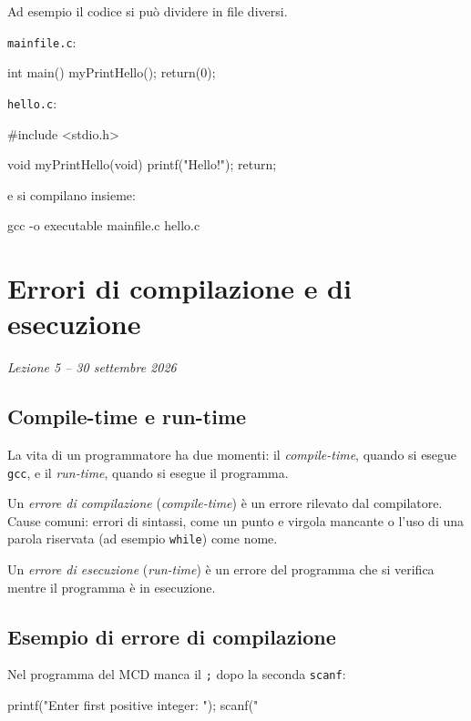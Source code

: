 \documentclass[11pt,a4paper]{article}
\begin{document}
Ad esempio il codice si può dividere in file diversi.

\texttt{mainfile.c}:
\begin{codice}
int main() {
    myPrintHello();
    return(0);
}
\end{codice}

\texttt{hello.c}:
\begin{codice}
#include <stdio.h>

void myPrintHello(void) {
    printf("Hello!\n");
    return;
}
\end{codice}

e si compilano insieme:
\begin{comando}
gcc -o executable mainfile.c hello.c
\end{comando}

\section[Errori di compilazione e di esecuzione (Lezione 5 -- 30 settembre 2026)]{Errori di compilazione e di esecuzione}
\noindent\emph{Lezione 5 -- 30 settembre 2026}
\subsection{Compile-time e run-time}

La vita di un programmatore ha due momenti: il \emph{compile-time}, quando si
esegue \texttt{gcc}, e il \emph{run-time}, quando si esegue il programma.

\begin{definizione}
Un \emph{errore di compilazione} (\emph{compile-time}) è un errore rilevato dal
compilatore. Cause comuni: errori di sintassi, come un punto e virgola mancante
o l'uso di una parola riservata (ad esempio \lstinline|while|) come nome.
\end{definizione}

\begin{definizione}
Un \emph{errore di esecuzione} (\emph{run-time}) è un errore del programma che
si verifica mentre il programma è in esecuzione.
\end{definizione}

\subsection{Esempio di errore di compilazione}

Nel programma del MCD manca il \texttt{;} dopo la seconda \lstinline|scanf|:
\begin{codice}
printf("Enter first positive integer: \n");
scanf("%
\end{codice}
\end{document}

